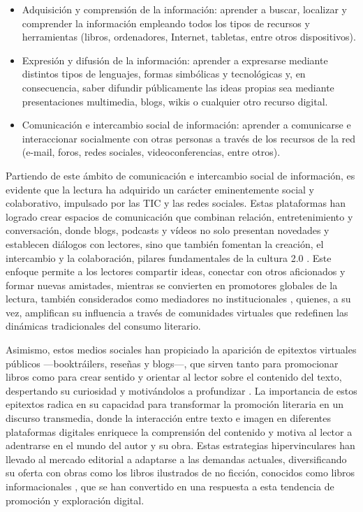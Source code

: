 \documentclass[spanish]{textolivre}
\begin{document}
\begin{itemize}
    \item Adquisición y comprensión de la información: aprender a buscar, localizar y comprender la información empleando todos los tipos de recursos y herramientas (libros, ordenadores, Internet, tabletas, entre otros dispositivos).
    \item Expresión y difusión de la información: aprender a expresarse mediante distintos tipos de lenguajes, formas simbólicas y tecnológicas y, en consecuencia, saber difundir públicamente las ideas propias sea mediante presentaciones multimedia, blogs, wikis o cualquier otro recurso digital.
    \item Comunicación e intercambio social de información: aprender a comunicarse e interaccionar socialmente con otras personas a través de los recursos de la red (e-mail, foros, redes sociales, videoconferencias, entre otros).
\end{itemize}

Partiendo de este ámbito de comunicación e intercambio social de información, es evidente que la lectura ha adquirido un carácter eminentemente social y colaborativo, impulsado por las TIC y las redes sociales. Estas plataformas han logrado crear espacios de comunicación que combinan relación, entretenimiento y conversación, donde blogs, podcasts y vídeos no solo presentan novedades y establecen diálogos con lectores, sino que también fomentan la creación, el intercambio y la colaboración, pilares fundamentales de la cultura 2.0 \cite{alonso_lectura_2014,ravettino_booktubers_2015,cruces_como_2017,alvarez_epitextos_2018}. Este enfoque permite a los lectores compartir ideas, conectar con otros aficionados y formar nuevas amistades, mientras se convierten en promotores globales de la lectura, también considerados como mediadores no institucionales \cite{romero_oliva_habitos_2020}, quienes, a su vez, amplifican su influencia a través de comunidades virtuales que redefinen las dinámicas tradicionales del consumo literario.

Asimismo, estos medios sociales han propiciado la aparición de epitextos virtuales públicos —booktráilers, reseñas y blogs—, que sirven tanto para promocionar libros como para crear sentido y orientar al lector sobre el contenido del texto, despertando su curiosidad y motivándolos a profundizar \cite{lluch_epitextos_2015,romero_oliva_epitextos_2021,tabernero-sala_promocion_2022}.  La importancia de estos epitextos radica en su capacidad para transformar la promoción literaria en un discurso transmedia, donde la interacción entre texto e imagen en diferentes plataformas digitales enriquece la comprensión del contenido y motiva al lector a adentrarse en el mundo del autor y su obra. Estas estrategias hipervinculares han llevado al mercado editorial a adaptarse a las demandas actuales, diversificando su oferta con obras como los libros ilustrados de no ficción, conocidos como libros informacionales \cite{duke_case_2004}, que se han convertido en una respuesta a esta tendencia de promoción y exploración digital.
\end{document}
